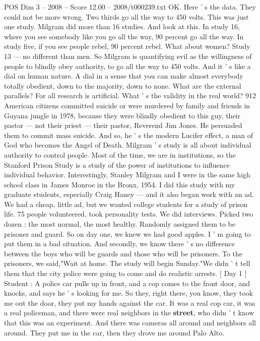 \begin{textsample}{POS Dim 3 – 2008 – Score 12.00 – 2008/t000239.txt}
OK.
Here ' s the data.
They could not be more wrong.
Two thirds go all the way to 450 volts.
This was just one study.
Milgram did more than 16 studies.
And look at this.
In study 16, where you see somebody like you go all the way, 90 percent go all the way.
In study five, if you see people rebel, 90 percent rebel.
What about women?
Study 13 — no different than men.
So Milgram is quantifying evil as the willingness of people to blindly obey authority, to go all the way to 450 volts.
And it ' s like a dial on human nature.
A dial in a sense that you can make almost everybody totally obedient, down to the majority, down to none.
What are the external parallels?
For all research is artificial.
What ' s the validity in the real world? 912 American citizens committed suicide or were murdered by family and friends in Guyana jungle in 1978, because they were blindly obedient to this guy, their pastor — not their priest — their pastor, Reverend Jim Jones.
He persuaded them to commit mass suicide.
And so, he ' s the modern Lucifer effect, a man of God who becomes the Angel of Death.
Milgram ' s study is all about individual authority to control people.
Most of the time, we are in institutions, so the Stanford Prison Study is a study of the power of institutions to influence individual behavior.
Interestingly, Stanley Milgram and I were in the same high school class in James Monroe in the Bronx, 1954.
I did this study with my graduate students, especially Craig Haney — and it also began work with an ad.
We had a cheap, little ad, but we wanted college students for a study of prison life. 75 people volunteered, took personality tests.
We did interviews.
Picked two dozen : the most normal, the most healthy.
Randomly assigned them to be prisoner and guard.
So on day one, we knew we had good apples.
I ' m going to put them in a bad situation.
And secondly, we know there ' s no difference between the boys who will be guards and those who will be prisoners.
To the prisoners, we said,"Wait at home.
The study will begin Sunday."We didn ' t tell them that the city police were going to come and do realistic arrests. [ Day 1 ] Student : A police car pulls up in front, and a cop comes to the front door, and knocks, and says he ' s looking for me.
So they, right there, you know, they took me out the door, they put my hands against the car.
It was a real cop car, it was a real policeman, and there were real neighbors in the \textbf{street}, who didn ' t know that this was an experiment.
And there was cameras all around and neighbors all around.
They put me in the car, then they drove me around Palo Alto.

\end{textsample}
